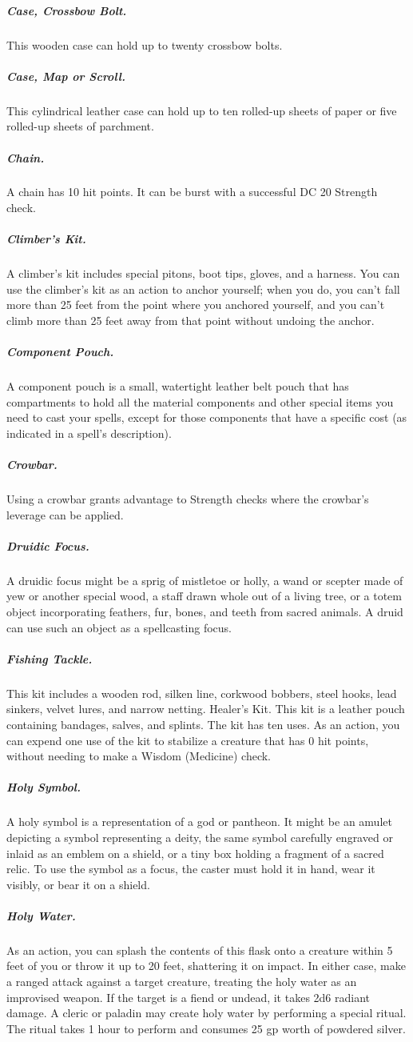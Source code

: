 \subparagraph*{Case, Crossbow Bolt.} This wooden case can hold up to twenty crossbow bolts.

\subparagraph*{Case, Map or Scroll.} This cylindrical leather case can hold up to ten rolled-up sheets of paper or five rolled-up sheets of parchment.

\subparagraph*{Chain.} A chain has 10 hit points. It can be burst with a successful DC 20 Strength check.

\subparagraph*{Climber's Kit.} A climber's kit includes special pitons, boot tips, gloves, and a harness. You can use the climber's kit as an action to anchor yourself; when you do, you can't fall more than 25 feet from the point where you anchored yourself, and you can't climb more than 25 feet away from that point without undoing the anchor.

\subparagraph*{Component Pouch.} A component pouch is a small, watertight leather belt pouch that has compartments to hold all the material components and other special items you need to cast your spells, except for those components that have a specific cost (as indicated in a spell's description).
\subparagraph*{Crowbar.} Using a crowbar grants advantage to Strength checks where the crowbar's leverage can be applied.

\subparagraph*{Druidic Focus.} A druidic focus might be a sprig of mistletoe or holly, a wand or scepter made of yew or another special wood, a staff drawn whole out of a living tree, or a totem object incorporating feathers, fur, bones, and teeth from sacred animals. A druid can use such an object as a spellcasting focus.

\subparagraph*{Fishing Tackle.} This kit includes a wooden rod, silken line, corkwood bobbers, steel hooks, lead sinkers, velvet lures, and narrow netting.
Healer's Kit. This kit is a leather pouch containing bandages, salves, and splints. The kit has ten uses. As an action, you can expend one use of the kit to stabilize a creature that has 0 hit points, without needing to make a Wisdom (Medicine) check.

\subparagraph*{Holy Symbol.} A holy symbol is a representation of a god or pantheon. It might be an amulet depicting a symbol representing a deity, the same symbol carefully engraved or inlaid as an emblem on a shield, or a tiny box holding a fragment of a sacred relic. To use the symbol as a focus, the caster must hold it in hand, wear it visibly, or bear it on a shield.

\subparagraph*{Holy Water.} As an action, you can splash the contents of this flask onto a creature within 5 feet of you or throw it up to 20 feet, shattering it on impact. In either case, make a ranged attack against a target creature, treating the holy water as an improvised weapon. If the target is a fiend or undead, it takes 2d6 radiant damage.
A cleric or paladin may create holy water by performing a special ritual. The ritual takes 1 hour to perform and consumes 25 gp worth of powdered silver.

